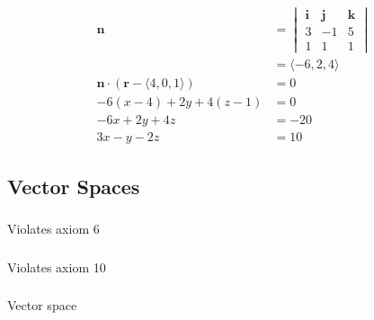\documentclass{article}
\begin{document}
\begin{align*}
  \mathbf{n}                                              & = \begin{vmatrix}
                                                                \mathbf{i} & \mathbf{j} & \mathbf{k} \\
                                                                3          & -1         & 5          \\
                                                                1          & 1          & 1
                                                              \end{vmatrix} \\
                                                          & = \langle -6, 2, 4 \rangle             \\
  \mathbf{n} \cdot (\mathbf{r} - \langle 4, 0, 1 \rangle) & = 0                                    \\
  -6 (x - 4) + 2 y + 4 (z - 1)                            & = 0                                    \\
  -6 x + 2 y + 4 z                                        & = -20                                  \\
  3 x - y - 2 z                                           & = 10
\end{align*}

\subsection{Vector Spaces}

\subsubsection{}

Violates axiom 6

\setcounter{subsubsection}{2}
\subsubsection{}

Violates axiom 10

\setcounter{subsubsection}{4}
\subsubsection{}

Vector space

\setcounter{subsubsection}{6}
\subsubsection{}
\end{document}
